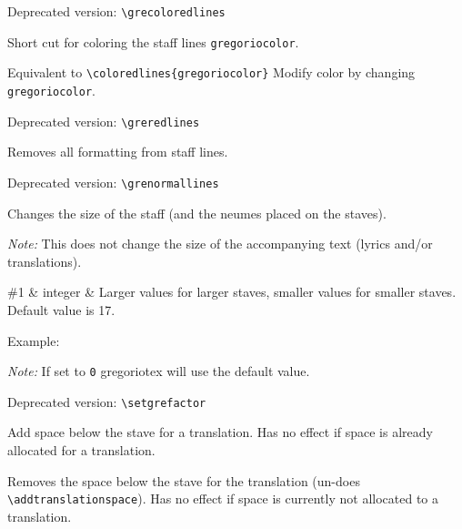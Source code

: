 \smallskip\hspace{15pt} Deprecated version: \verb=\grecoloredlines=

Short cut for coloring the staff lines \verb=gregoriocolor=.

Equivalent to \verb=\coloredlines{gregoriocolor}= Modify color by
changing \verb=gregoriocolor=.

\smallskip\hspace{15pt} Deprecated version: \verb=\greredlines=

Removes all formatting from staff lines.

\smallskip\hspace{15pt} Deprecated version: \verb=\grenormallines=

Changes the size of the staff (and the neumes placed on the staves).

\emph{Note:} This does not change the size of the accompanying text
(lyrics and/or translations).

\begin{argtable}
  \#1 & integer & Larger values for larger staves, smaller values for
  smaller staves. Default value is 17. \\
\end{argtable}

Example:\par\medskip
\begin{latexcode}
\end{latexcode}

\emph{Note:} If set to \verb=0= gregoriotex will use the default value.

\smallskip\hspace{15pt} Deprecated version: \verb=\setgrefactor=

Add space below the stave for a translation.  Has no effect if space
is already allocated for a translation.

Removes the space below the stave for the translation (un-does\\
\verb=\addtranslationspace=). Has no effect if space is currently not
allocated to a translation.

